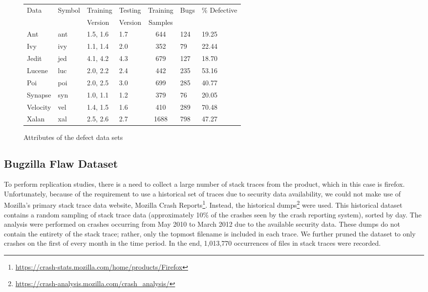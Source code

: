 \documentclass[12pt]{IEEEtran}
\begin{document}
\begin{figure}[tbp!]
	\renewcommand{\baselinestretch}{1.25}\begin{center}
		{\scriptsize
			\begin{tabular}{l@{~~~}l@{~~~}l@{~~~}l@{~~~}c@{~~~}l@{~~}l@{~~}}
				\hline
				\rowcolor[HTML]{EFEFEF}
				Data & Symbol & Training & Testing & Training& Bugs&\% {\cellcolor[HTML]{EFEFEF}Defective}\\
				\rowcolor[HTML]{EFEFEF}
				 &  & Version & Version & Samples& &\\\hline
				 
				
				Ant & ant & 1.5, 1.6  &1.7 & 644&124&19.25\\
				
				Ivy & ivy & 1.1, 1.4 & 2.0  & 352 & 79 & 22.44\\
				
				Jedit & jed & 4.1, 4.2 & 4.3 & 679 & 127 & 18.70\\
								
				Lucene & luc & 2.0, 2.2 & 2.4 & 442 & 235 & 53.16\\
				
				Poi & poi & 2.0, 2.5 & 3.0 & 699 & 285 & 40.77\\
				
				Synapse & syn & 1.0, 1.1 & 1.2 & 379 & 76 & 20.05\\
				
				Velocity & vel & 1.4, 1.5 & 1.6 & 410& 289 & 70.48\\
				
				Xalan & xal &2.5, 2.6 &2.7 & 1688 & 798 & 47.27\\\hline
			\end{tabular}}
		\end{center}
		\caption{Attributes of the defect data sets}\label{fig:attr}
	\end{figure}


\subsection{Bugzilla Flaw Dataset}

To perform replication studies, there is a need to collect a large number of stack traces from the product, which in this case is firefox. Unfortunately, because of the requirement to use a historical set of traces due to security data availability, we could not make use of Mozilla’s primary stack trace data website, Mozilla Crash Reports\footnote{\url{https://crash-stats.mozilla.com/home/products/Firefox}}. Instead, the historical dumps\footnote{\url{https://crash-analysis.mozilla.com/crash_analysis/}} were used. This historical dataset contains a random sampling of stack trace data (approximately 10\% of the crashes seen by the crash reporting system), sorted by day. The analysis were performed on crashes occurring from May 2010 to March 2012 due to the available security data. These dumps do not contain the entirety of the stack trace; rather, only the topmost filename is included in each trace. We further pruned the dataset to only crashes on the first of every month in the time period. In the end, 1,013,770 occurrences of files in stack traces were recorded.
\end{document}
